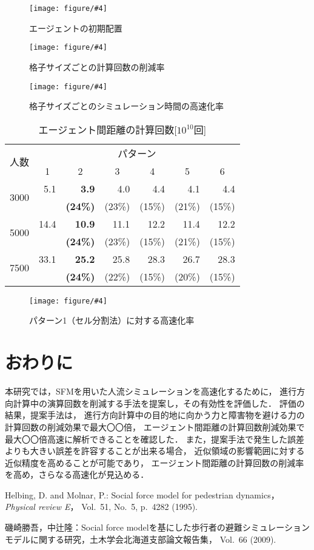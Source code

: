\documentclass{maelab_y}
\newcommand{\figtb}[5]{ %
\begin{figure}[hbtp]
  \begin{center}
    \texttt{[image: figure/\#4]}
    \caption{#1}
    \label{fig:#5}
  \end{center}
\end{figure}
}%
\newcommand{\分類条件}{%
\begin{table}[t]
\begin{center}
\caption{進行方向を分類する条件}
\ecaption{Classification condition of moving direction $e_{i}$.}
\label{tb:hantei_jouken}
\begin{tabular}{c|c|c|c|c}
\hline \hline
			& 右 & 左 & 上 & 下 \\ \hline
パターン2   & $\frac{1}{\sqrt{2}} < e_x \leq 1  $
		    & $ -1 \leq e_x < \frac{-1}{\sqrt{2}}$ 
		    & $ \frac{-1}{\sqrt{2}} < e_x < \frac{1}{\sqrt{2}} $ 
		    & $ \frac{-1}{2} < e_x < \frac{1}{2} $ \\
パターン3   & $\frac{-1}{2} < e_y < \frac{1}{2} $ 
		    & $\frac{-1}{2} < e_y < \frac{1}{2} $
            & $ \frac{1}{\sqrt{2}} < e_y \leq 1$
		    & $ -1 \leq e_y < \frac{-1}{\sqrt{2}} $ \\
\hline
\multirow{2}{*}{パターン4}   
			& $R_x \geq A_x$ & $R_x < A_x$ & $R_y \geq A_y$ & $R_y < A_y $ \\
	        &  $L_x \geq A_x$ & $L_x < A_x$ & $L_y \geq A_y$ & $L_y < A_y$ \\
\hline
\multirow{2}{*}{パターン5}   
 			& $R_x \geq x_1$ & $R_x < x_2$ & $R_y \geq y_1$ & $R_y < y_2 $ \\
			& $L_x \geq x_1$ & $L_x < x_2$ & $L_y \geq y_1$ & $L_y < y_2 $ \\
\hline
パターン6   & $ \cos(\frac{1}{2}\theta_{view}) \leq  e_y $ 
			& $ e_y \leq -\cos(\frac{1}{2}\theta_{view})$ 
			& $ \sin(\frac{1}{2}(\pi - \theta_{view})) \leq e_x $ 
			& $ e_x \leq \sin(\frac{1}{2}(\pi - \theta_{view}))  $ \\
\hline
\end{tabular}
\end{center}
\end{table}
}%
\newcommand{\距離計算new}{%
  \begin{table}[hbtp]
    \begin{center}
    \caption{エージェント間距離の計算回数[$10^{10}$回]}
    \label{tab:keisan_kaisu}
    \begin{tabular}{c|llllll}
    \hline \hline
    \multirow{2}{*}{人数}   & \multicolumn{6}{c}{パターン}                                                                                                                                                             \\ \cline{2-7} 
                          & \multicolumn{1}{c|}{1}    & \multicolumn{1}{c|}{2}               & \multicolumn{1}{c|}{3}      & \multicolumn{1}{c|}{4}      & \multicolumn{1}{c|}{5}      & \multicolumn{1}{c}{6}    \\ \hline
    \multirow{2}{*}{3000} & \multicolumn{1}{r|}{5.1}  & \multicolumn{1}{r|}{\textbf{3.9}}    & \multicolumn{1}{r|}{4.0}    & \multicolumn{1}{r|}{4.4}    & \multicolumn{1}{r|}{4.1}    & \multicolumn{1}{r}{4.4}  \\
                          & \multicolumn{1}{l|}{}     & \multicolumn{1}{l|}{\textbf{(24\%)}} & \multicolumn{1}{l|}{(23\%)} & \multicolumn{1}{l|}{(15\%)} & \multicolumn{1}{l|}{(21\%)} & (15\%)                   \\ \hline
    \multirow{2}{*}{5000} & \multicolumn{1}{r|}{14.4} & \multicolumn{1}{r|}{\textbf{10.9}}   & \multicolumn{1}{r|}{11.1}   & \multicolumn{1}{r|}{12.2}   & \multicolumn{1}{r|}{11.4}   & \multicolumn{1}{r}{12.2} \\
                          & \multicolumn{1}{l|}{}     & \multicolumn{1}{l|}{\textbf{(24\%)}} & \multicolumn{1}{l|}{(23\%)} & \multicolumn{1}{l|}{(15\%)} & \multicolumn{1}{l|}{(21\%)} & (15\%)                   \\ \hline
    \multirow{2}{*}{7500} & \multicolumn{1}{r|}{33.1} & \multicolumn{1}{r|}{\textbf{25.2}}   & \multicolumn{1}{r|}{25.8}   & \multicolumn{1}{r|}{28.3}   & \multicolumn{1}{r|}{26.7}   & \multicolumn{1}{r}{28.3} \\
                          & \multicolumn{1}{l|}{}     & \multicolumn{1}{l|}{\textbf{(24\%)}} & \multicolumn{1}{l|}{(22\%)} & \multicolumn{1}{l|}{(15\%)} & \multicolumn{1}{l|}{(20\%)} & (15\%)                   \\ \hline
    \end{tabular}
    \end{center}
    \end{table}
}%
\newcommand{\粒子数}{%
\begin{table}[hbtp]
  \begin{center}
    \caption{各配置の詳細}
    \label{tb:haichi_para}
    \begin{tabular}{c|c|c}
      \hline \hline
      & 教室 & 演習室 \\ \hline 
      エージェント数[人] & 96 & 204 \\ \hline
      壁粒子数[個] & 1037 & 1454\\ \hline
      経由地数[個] & 12   & 26 \\ \hline
      解析領域 & $50m\times50m$ & $50m\times50m$ \\ \hline
    \end{tabular}
  \end{center}
\end{table}
}%
\newcommand{\評価環境}{%
\begin{table}[hbtp]
  \begin{center}
    \caption{各配置の詳細}
    \label{tb:haichi_para}
    \begin{tabular}{c|c|c}
      \hline \hline
                 & マシン1                & マシン2 \\ \hline 
      CPU        & Intel Xeon E5-2687W & Intel Xeon E5-2667W \\ \hline
      メモリ     & 64GB                   & 64GB \\ \hline
      OS         & Linux 4.12.9            & Linux 6.5.8 \\ \hline
      コンパイラ & gcc 7.2.0             & gcc 13.2.0 \\ \hline
    \end{tabular}
  \end{center}
\end{table}
}%
\newcommand{\判定条件new}{%
  \begin{table}[hbtp]
    \centering
		\caption{パターンごとの進行方向分類条件}
		\label{tb:joken}
		{\scriptsize
    \begin{tabular}{Wc{0.5em}|cccWc{8em}}
    \hline \hline
                          & \multicolumn{1}{c|}{パターン2，3} & \multicolumn{1}{c|}{パターン4}   & \multicolumn{1}{c|}{パターン5}   & パターン6                   \\ \hline
    \multirow{2}{*}{右}    & \multicolumn{1}{c|}{$\frac{1}{\sqrt{2}} < e_x \leq 1$}  & \multicolumn{1}{c|}{$R_x \geq A_x$}  & \multicolumn{1}{c|}{$R_x \geq x_1$}  & \multirow{2}{*}{$ \cos(\frac{1}{2}\theta_v) \leq  e_y $} \\
                          & \multicolumn{1}{c|}{$\frac{-1}{2} < e_y < \frac{1}{2} $}   & \multicolumn{1}{l|}{$L_x \geq A_x$} & \multicolumn{1}{l|}{$L_x \geq x_1$} &                     \\ \hline
    \multirow{2}{*}{左}    & \multicolumn{1}{c|}{$ -1 \leq e_x < \frac{-1}{\sqrt{2}}$}  & \multicolumn{1}{c|}{$R_x < A_x$}  & \multicolumn{1}{c|}{$R_x < x_2$}  & \multirow{2}{*}{$ e_y \leq -\cos(\frac{1}{2}\theta_{v})$} \\
                          & \multicolumn{1}{l|}{$\frac{-1}{2} < e_y < \frac{1}{2} $}   & \multicolumn{1}{l|}{$L_x < A_x$} & \multicolumn{1}{l|}{$L_x < x_2$ } &                     \\ \hline
    \multirow{2}{*}{上}    & \multicolumn{1}{c|}{$ \frac{-1}{\sqrt{2}} < e_x < \frac{1}{\sqrt{2}}$}  & \multicolumn{1}{c|}{$R_y \geq A_y$ }  & \multicolumn{1}{c|}{$R_y \geq y_1$ }  & \multirow{2}{*}{$ \sin(\frac{1}{2}(\theta_{\pi - v})) \leq e_x$} \\
                          & \multicolumn{1}{l|}{$ \frac{1}{\sqrt{2}} < e_y \leq 1$}   & \multicolumn{1}{l|}{$L_y \geq A_y$} & \multicolumn{1}{l|}{$L_y \geq y_1$} &                     \\ \hline
    \multirow{2}{*}{下}    & \multicolumn{1}{c|}{$ \frac{-1}{2} < e_x < \frac{1}{2} $}  & \multicolumn{1}{c|}{$R_y < A_y $}  & \multicolumn{1}{c|}{$R_y < y_2 $ }  & \multirow{2}{*}{$ e_x \leq \sin(\frac{1}{2}(\theta_{\pi - v}))$} \\
                          & \multicolumn{1}{l|}{$ -1 \leq e_y < \frac{-1}{\sqrt{2}} $}   & \multicolumn{1}{l|}{$L_y < A_y$} & \multicolumn{1}{l|}{$L_y < y_2 $ } &                     \\ \hline
    \end{tabular}
		}
    \end{table}
}%
\begin{document}
\figtb{エージェントの初期配置}{Initial position of agents.}{8}{agent_position.eps}{agent_haichi}

\figtb{格子サイズごとの計算回数の削減率}{}{8.0}{haba_sakugenritu2.eps}{haba_sakugenritu}
\figtb{格子サイズごとのシミュレーション時間の高速化率}{}{8.0}{haba_kousokuka.eps}{haba_kousokuka}

\距離計算new
\figtb{パターン1（セル分割法）に対する高速化率}{}{8}{20230226_kousokuka.eps}{kousokuka2}

\section{おわりに}
本研究では，SFMを用いた人流シミュレーションを高速化するために，
進行方向計算中の演算回数を削減する手法を提案し，その有効性を評価した．
評価の結果，提案手法は，
進行方向計算中の目的地に向かう力と障害物を避ける力の計算回数の削減効果で最大〇〇倍，
エージェント間距離の計算回数削減効果で最大〇〇倍高速に解析できることを確認した．
また，提案手法で発生した誤差よりも大きい誤差を許容することが出来る場合，
近似領域の影響範囲に対する近似精度を高めることが可能であり，
エージェント間距離の計算回数の削減率を高め，さらなる高速化が見込める．


\begin{thebibliography}{9}
\footnotesize
{}
  Helbing, D. and Molnar, P.: Social force model for pedestrian dynamics，{\em
    Physical review E}， Vol.~51, No.~5, p.\ 4282 (1995).

  磯崎勝吾，中辻隆：Social force
  modelを基にした歩行者の避難シミュレーションモデルに関する研究，土木学会北海道支部論文報告集，
  Vol.~66 (2009).
\end{thebibliography}
\end{document}
